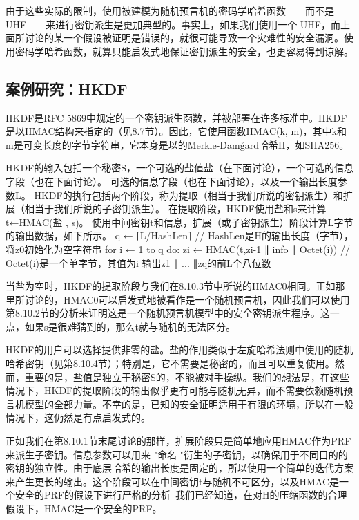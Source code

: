 由于这些实际的限制，使用被建模为随机预言机的密码学哈希函数——而不是 UHF——来进行密钥派生是更加典型的。事实上，如果我们使用一个 UHF，而上面所讨论的某一个假设被证明是错误的，就很可能导致一个灾难性的安全漏洞。使用密码学哈希函数，就算只能启发式地保证密钥派生的安全，也更容易得到谅解。
 
\subsection{案例研究：HKDF}\label{subsec:8-10-5}

HKDF是RFC 5869中规定的一个密钥派生函数，并被部署在许多标准中。HKDF是以HMAC结构来指定的（见8.7节）。因此，它使用函数HMAC(k, m)，其中k和m是可变长度的字节字符串，它本身是以的Merkle-Damg̊ard哈希H，如SHA256。

HKDF的输入包括一个秘密S，一个可选的盐值盐（在下面讨论），一个可选的信息字段（也在下面讨论）。
可选的信息字段（也在下面讨论），以及一个输出长度参数L。
HKDF的执行包括两个阶段，称为提取（相当于我们所说的密钥派生）和扩展（相当于我们所说的子密钥派生）。
在提取阶段，HKDF使用盐和s来计算t←HMAC(盐 , s)。
使用中间密钥t和信息，扩展（或子密钥派生）阶段计算L字节的输出数据，如下所示。
q ← ⌈L/HashLen⌉ // HashLen是H的输出长度（字节），将z0初始化为空字符串
for i ← 1 to q do:
zi ← HMAC(t,zi-1 ∥ info ∥ Octet(i)) // Octet(i)是一个单字节，其值为i 输出z1 ∥ ... ∥zq的前L个八位数

当盐为空时，HKDF的提取阶段与我们在8.10.3节中所说的HMAC0相同。正如那里所讨论的，HMAC0可以启发式地被看作是一个随机预言机，因此我们可以使用第8.10.2节的分析来证明这是一个随机预言机模型中的安全密钥派生程序。这一点，如果s是很难猜到的，那么t就与随机的无法区分。

HKDF的用户可以选择提供非零的盐。盐的作用类似于左旋哈希法则中使用的随机哈希密钥（见第8.10.4节）；特别是，它不需要是秘密的，而且可以重复使用。然而，重要的是，盐值是独立于秘密S的，不能被对手操纵。我们的想法是，在这些情况下，HKDF的提取阶段的输出似乎更有可能与随机无异，而不需要依赖随机预言机模型的全部力量。不幸的是，已知的安全证明适用于有限的环境，所以在一般情况下，这仍然是有点启发式的。

正如我们在第8.10.1节末尾讨论的那样，扩展阶段只是简单地应用HMAC作为PRF来派生子密钥。信息参数可以用来 "命名 "衍生的子密钥，以确保用于不同目的的密钥的独立性。由于底层哈希的输出长度是固定的，所以使用一个简单的迭代方案来产生更长的输出。这个阶段可以在中间密钥t与随机不可区分，以及HMAC是一个安全的PRF的假设下进行严格的分析--我们已经知道，在对H的压缩函数的合理假设下，HMAC是一个安全的PRF。